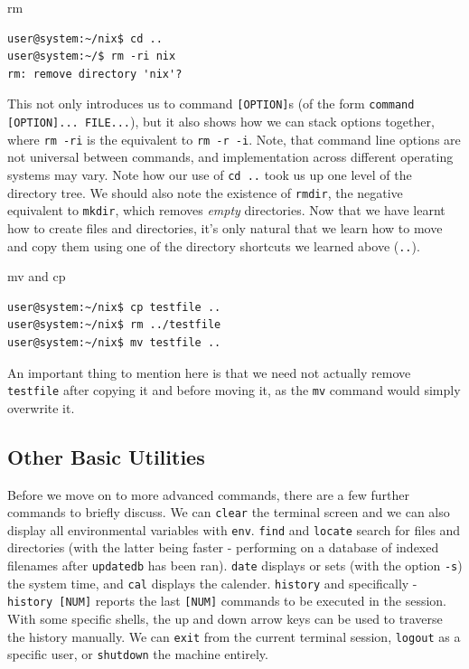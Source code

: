 \documentclass[11pt]{article}
\begin{document}
\begin{listing}[H]
\caption{rm}\vspace{-0.1in}
\begin{verbatim}
user@system:~/nix$ cd ..
user@system:~/$ rm -ri nix
rm: remove directory 'nix'?
\end{verbatim}
\end{listing}

This not only introduces us to command \texttt{[OPTION]}s (of the form \texttt{command [OPTION]... FILE...}), but it also shows how we can stack options together, where \texttt{rm -ri} is the equivalent to \texttt{rm -r -i}. Note, that command line options are not universal between commands, and implementation across different operating systems may vary. Note how our use of \texttt{cd ..} took us up one level of the directory tree. We should also note the existence of \texttt{rmdir}, the negative equivalent to \texttt{mkdir}, which removes \emph{empty} directories. Now that we have learnt how to create files and directories, it's only natural that we learn how to move and copy them using one of the directory shortcuts we learned above (\texttt{..}).\\

\begin{listing}[H]
\caption{mv and cp}\vspace{-0.1in}
\begin{verbatim}
user@system:~/nix$ cp testfile ..
user@system:~/nix$ rm ../testfile
user@system:~/nix$ mv testfile ..
\end{verbatim}
\end{listing}

An important thing to mention here is that we need not actually remove \texttt{testfile} after copying it and before moving it, as the \texttt{mv} command would simply overwrite it.

\subsection{Other Basic Utilities}

Before we move on to more advanced commands, there are a few further commands to briefly discuss. We can \texttt{clear} the terminal screen and we can also display all environmental variables with \texttt{env}. \texttt{find} and \texttt{locate} search for files and directories (with the latter being faster - performing on a database of indexed filenames after \texttt{updatedb} has been ran). \texttt{date} displays or sets (with the option \texttt{-s}) the system time, and \texttt{cal} displays the calender. \texttt{history} and specifically - \texttt{history [NUM]} reports the last \texttt{[NUM]} commands to be executed in the session. With some specific shells, the up and down arrow keys can be used to traverse the history manually. We can \texttt{exit} from the current terminal session, \texttt{logout} as a specific user, or \texttt{shutdown} the machine entirely.
\end{document}
